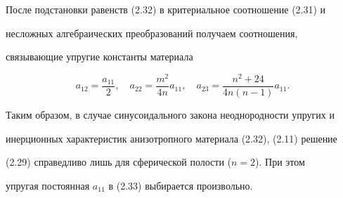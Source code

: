После подстановки равенств (2.32) в критериальное соотношение (2.31) и 


несложных алгебраических преобразований получаем соотношения, 


связывающие упругие константы материала 


\begin{equation} 


a_{12}=\frac{a_{11}}{2},\quad a_{22}=\frac{m^2}{4n}a_{11},\quad 


a_{23}=\frac{n^2+24}{4n(n-1)}a_{11}. 


\end{equation} 


 


Таким образом, в случае синусоидального закона неоднородности упругих и 


инерционных характеристик анизотропного материала (2.32), (2.11) решение 


(2.29) справедливо лишь для сферической полости ($n=2$). При этом 


упругая постоянная $a_{11}$ в (2.33) выбирается произвольно. 


 


